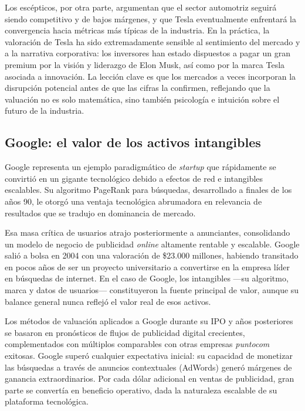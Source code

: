 Los escépticos, por otra parte, argumentan que el sector automotriz seguirá siendo competitivo y de bajos márgenes, y que Tesla eventualmente enfrentará la convergencia hacia métricas más típicas de la industria. En la práctica, la valoración de Tesla ha sido extremadamente sensible al sentimiento del mercado y a la narrativa corporativa: los inversores han estado dispuestos a pagar un gran premium por la visión y liderazgo de Elon Musk, así como por la marca Tesla asociada a innovación. La lección clave es que los mercados a veces incorporan la disrupción potencial antes de que las cifras la confirmen, reflejando que la valuación no es solo matemática, sino también psicología e intuición sobre el futuro de la industria.

\subsection{Google: el valor de los activos intangibles}

Google representa un ejemplo paradigmático de \emph{startup} que rápidamente se convirtió en un gigante tecnológico debido a efectos de red e intangibles escalables. Su algoritmo PageRank para búsquedas, desarrollado a finales de los años 90, le otorgó una ventaja tecnológica abrumadora en relevancia de resultados que se tradujo en dominancia de mercado.

Esa masa crítica de usuarios atrajo posteriormente a anunciantes, consolidando un modelo de negocio de publicidad \emph{online} altamente rentable y escalable. Google salió a bolsa en 2004 con una valoración de \$23.000 millones, habiendo transitado en pocos años de ser un proyecto universitario a convertirse en la empresa líder en búsquedas de internet. En el caso de Google, los intangibles ---su algoritmo, marca y datos de usuarios--- constituyeron la fuente principal de valor, aunque su balance general nunca reflejó el valor real de esos activos.

Los métodos de valuación aplicados a Google durante su IPO y años posteriores se basaron en pronósticos de flujos de publicidad digital crecientes, complementados con múltiplos comparables con otras empresas \emph{puntocom} exitosas. Google superó cualquier expectativa inicial: su capacidad de monetizar las búsquedas a través de anuncios contextuales (AdWords) generó márgenes de ganancia extraordinarios. Por cada dólar adicional en ventas de publicidad, gran parte se convertía en beneficio operativo, dada la naturaleza escalable de su plataforma tecnológica.


